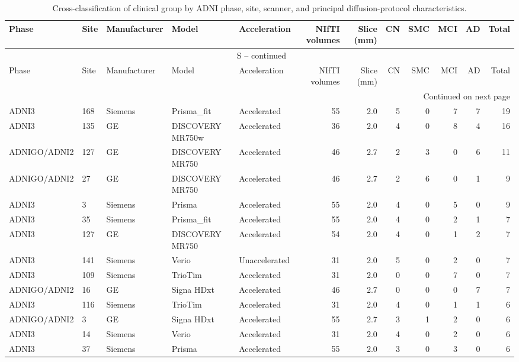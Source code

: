 \documentclass{article}
\renewcommand{\thetable}{S\arabic{table}}
\begin{document}
\begin{landscape}
\scriptsize
\setlength{\tabcolsep}{2.5pt}
\begin{longtable}{lllllrrrrrrr}
\caption{Cross-classification of clinical group by ADNI phase, site, scanner, and principal diffusion-protocol characteristics.}\label{tab:acquisition_cells} \\
\toprule
Phase & Site & Manufacturer & Model & Acceleration & NIfTI volumes & Slice (mm) & CN & SMC & MCI & AD & Total \\
\midrule
\endfirsthead
\multicolumn{12}{c}{\tablename\ \thetable{} -- continued} \\
\toprule
Phase & Site & Manufacturer & Model & Acceleration & NIfTI volumes & Slice (mm) & CN & SMC & MCI & AD & Total \\
\midrule
\endhead
\midrule
\multicolumn{12}{r}{Continued on next page} \\
\endfoot
\bottomrule
\endlastfoot
ADNI3 & 168 & Siemens & Prisma\_fit & Accelerated & 55 & 2.0 & 5 & 0 & 7 & 7 & 19 \\
ADNI3 & 135 & GE & DISCOVERY MR750w & Accelerated & 36 & 2.0 & 4 & 0 & 8 & 4 & 16 \\
ADNIGO/ADNI2 & 127 & GE & DISCOVERY MR750 & Accelerated & 46 & 2.7 & 2 & 3 & 0 & 6 & 11 \\
ADNIGO/ADNI2 & 27 & GE & DISCOVERY MR750 & Accelerated & 46 & 2.7 & 2 & 6 & 0 & 1 & 9 \\
ADNI3 & 3 & Siemens & Prisma & Accelerated & 55 & 2.0 & 4 & 0 & 5 & 0 & 9 \\
ADNI3 & 35 & Siemens & Prisma\_fit & Accelerated & 55 & 2.0 & 4 & 0 & 2 & 1 & 7 \\
ADNI3 & 127 & GE & DISCOVERY MR750 & Accelerated & 54 & 2.0 & 4 & 0 & 1 & 2 & 7 \\
ADNI3 & 141 & Siemens & Verio & Unaccelerated & 31 & 2.0 & 5 & 0 & 2 & 0 & 7 \\
ADNI3 & 109 & Siemens & TrioTim & Accelerated & 31 & 2.0 & 0 & 0 & 7 & 0 & 7 \\
ADNIGO/ADNI2 & 16 & GE & Signa HDxt & Accelerated & 46 & 2.7 & 0 & 0 & 0 & 7 & 7 \\
ADNI3 & 116 & Siemens & TrioTim & Accelerated & 31 & 2.0 & 4 & 0 & 1 & 1 & 6 \\
ADNIGO/ADNI2 & 3 & GE & Signa HDxt & Accelerated & 55 & 2.7 & 3 & 1 & 2 & 0 & 6 \\
ADNI3 & 14 & Siemens & Verio & Accelerated & 31 & 2.0 & 4 & 0 & 2 & 0 & 6 \\
ADNI3 & 37 & Siemens & Prisma & Accelerated & 55 & 2.0 & 3 & 0 & 3 & 0 & 6 \\

\end{longtable}
\end{landscape}
\end{document}

